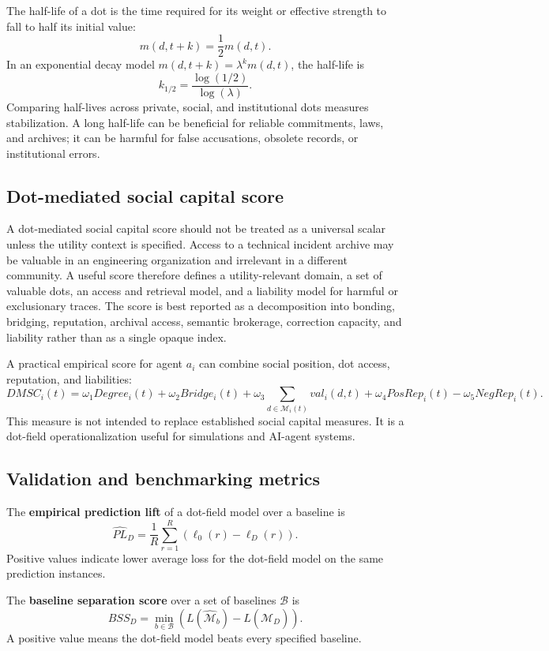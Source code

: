 \documentclass[11pt]{article}
\theoremstyle{remark}
\begin{document}
The half-life of a dot is the time required for its weight or effective strength to fall to half its initial value:
\[
m(d,t+k)=\frac{1}{2}m(d,t).
\]
In an exponential decay model $m(d,t+k)=\lambda^k m(d,t)$, the half-life is
\[
k_{1/2}=\frac{\log(1/2)}{\log(\lambda)}.
\]
Comparing half-lives across private, social, and institutional dots measures stabilization. A long half-life can be beneficial for reliable commitments, laws, and archives; it can be harmful for false accusations, obsolete records, or institutional errors.

\subsection{Dot-mediated social capital score}\label{dot-mediated-social-capital-score}

A dot-mediated social capital score should not be treated as a universal scalar unless the utility context is specified. Access to a technical incident archive may be valuable in an engineering organization and irrelevant in a different community. A useful score therefore defines a utility-relevant domain, a set of valuable dots, an access and retrieval model, and a liability model for harmful or exclusionary traces. The score is best reported as a decomposition into bonding, bridging, reputation, archival access, semantic brokerage, correction capacity, and liability rather than as a single opaque index.


A practical empirical score for agent \(a_i\) can combine social
position, dot access, reputation, and liabilities: \[
DMSC_i(t)=
\omega_1 Degree_i(t)+
\omega_2 Bridge_i(t)+
\omega_3 \sum_{d\in \mathcal M_i(t)} val_i(d,t)+
\omega_4 PosRep_i(t)-
\omega_5 NegRep_i(t).
\] This measure is not intended to replace established social capital
measures. It is a dot-field operationalization useful for simulations
and AI-agent systems.

\subsection{Validation and benchmarking metrics}\label{validation-and-benchmarking-metrics}

The \textbf{empirical prediction lift} of a dot-field model over a baseline is
\[
\widehat{PL}_D=\frac{1}{R}\sum_{r=1}^R\left(\ell_0(r)-\ell_D(r)\right).
\]
Positive values indicate lower average loss for the dot-field model on the same
prediction instances.

The \textbf{baseline separation score} over a set of baselines
\(\mathcal B\) is
\[
BSS_D=\min_{b\in\mathcal B}\left(L(\widehat{\mathcal M}_b)-L(\widehat{\mathcal M}_D)\right).
\]
A positive value means the dot-field model beats every specified baseline.
\end{document}
